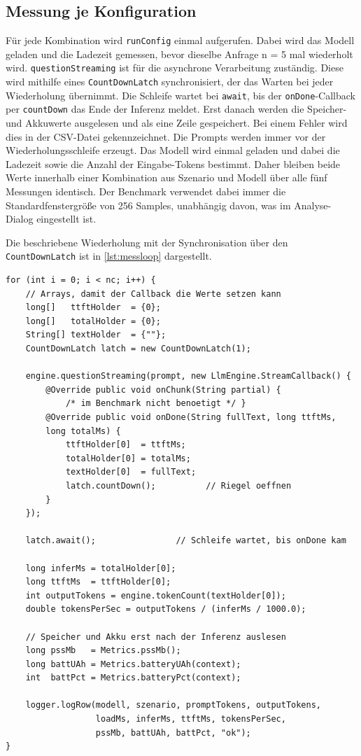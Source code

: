 \subsection{Messung je Konfiguration} Für jede Kombination wird \texttt{runConfig} einmal aufgerufen. Dabei wird das Modell geladen und die Ladezeit gemessen, bevor dieselbe Anfrage n = 5 mal wiederholt wird. \texttt{questionStreaming} ist für die asynchrone Verarbeitung zuständig. Diese wird mithilfe eines \texttt{CountDownLatch} synchronisiert, der das Warten bei jeder Wiederholung übernimmt. Die Schleife wartet bei \texttt{await}, bis der \texttt{onDone}-Callback per \texttt{countDown} das Ende der Inferenz meldet. Erst danach werden die Speicher- und Akkuwerte ausgelesen und als eine Zeile gespeichert. Bei einem Fehler wird dies in der \ac{CSV}-Datei gekennzeichnet.
\newpage
\noindent Die Prompts werden immer vor der Wiederholungsschleife erzeugt. Das Modell wird einmal geladen und dabei die Ladezeit sowie die Anzahl der Eingabe-Tokens bestimmt. Daher bleiben beide Werte innerhalb einer Kombination aus Szenario und Modell über alle fünf Messungen identisch. Der Benchmark verwendet dabei immer die Standardfenstergröße von 256 Samples, unabhängig davon, was im Analyse-Dialog eingestellt ist.
\vspace{\baselineskip}

\noindent Die beschriebene Wiederholung mit der Synchronisation über den \texttt{CountDownLatch} ist in \autoref{lst:messloop} dargestellt.
\begin{lstlisting}[style=code, caption={[Wiederholte Messung]Wiederholte Messung mit Synchronisation ueber CountDownLatch. Die Schleife wartet, bis die asynchrone Ausgabe abgeschlossen ist.}, label={lst:messloop}]
for (int i = 0; i < nc; i++) {
    // Arrays, damit der Callback die Werte setzen kann
    long[]   ttftHolder  = {0};
    long[]   totalHolder = {0};
    String[] textHolder  = {""};
    CountDownLatch latch = new CountDownLatch(1);

    engine.questionStreaming(prompt, new LlmEngine.StreamCallback() {
        @Override public void onChunk(String partial) {
            /* im Benchmark nicht benoetigt */ }
        @Override public void onDone(String fullText, long ttftMs,
        long totalMs) {
            ttftHolder[0]  = ttftMs;
            totalHolder[0] = totalMs;
            textHolder[0]  = fullText;
            latch.countDown();          // Riegel oeffnen
        }
    });

    latch.await();                // Schleife wartet, bis onDone kam

    long inferMs = totalHolder[0];
    long ttftMs  = ttftHolder[0];
    int outputTokens = engine.tokenCount(textHolder[0]);
    double tokensPerSec = outputTokens / (inferMs / 1000.0);

    // Speicher und Akku erst nach der Inferenz auslesen
    long pssMb   = Metrics.pssMb();
    long battUAh = Metrics.batteryUAh(context);
    int  battPct = Metrics.batteryPct(context);

    logger.logRow(modell, szenario, promptTokens, outputTokens,
                  loadMs, inferMs, ttftMs, tokensPerSec,
                  pssMb, battUAh, battPct, "ok");
}
\end{lstlisting}

